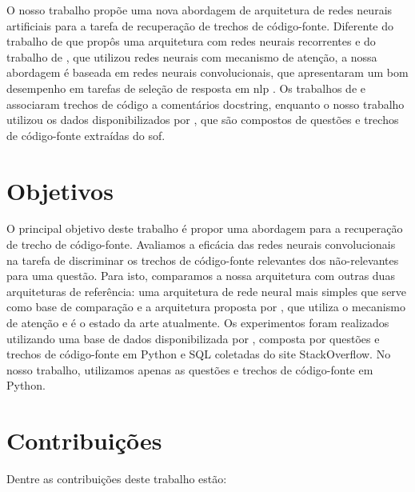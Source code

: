 O nosso trabalho propõe uma nova abordagem de arquitetura de redes neurais artificiais para a tarefa de recuperação de trechos de código-fonte. Diferente do trabalho de  que propôs uma arquitetura com redes neurais recorrentes e do trabalho de , que utilizou redes neurais com mecanismo de atenção, a nossa abordagem é baseada em redes neurais convolucionais, que apresentaram um bom desempenho em tarefas de seleção de resposta em \acrshort{nlp} \cite{feng-2015, tan-lstm-qa, wen-joint-modeling-question-answer-2019}. Os trabalhos de  e  associaram trechos de código a comentários \gls{docstring}, enquanto o nosso trabalho utilizou os dados disponibilizados por , que são compostos de questões e trechos de código-fonte extraídas do \Gls{sof}.

\section{Objetivos}
\label{sec:objetivo}

O principal objetivo deste trabalho é propor uma abordagem  para a recuperação de trecho de código-fonte. Avaliamos a eficácia das redes neurais convolucionais na tarefa de discriminar os trechos de código-fonte relevantes dos não-relevantes para uma questão. Para isto, comparamos a nossa arquitetura com outras duas arquiteturas de referência: uma arquitetura de rede neural mais simples que serve como base de comparação e a arquitetura proposta por , que utiliza o mecanismo de atenção e é o estado da arte atualmente. Os experimentos foram realizados utilizando uma base de dados disponibilizada por , composta por questões e trechos de código-fonte em Python e SQL coletadas do site StackOverflow. No nosso trabalho, utilizamos apenas as questões e trechos de código-fonte em Python.

\section{Contribuições}
\label{sec:contribucoes}

Dentre as contribuições deste trabalho estão:

